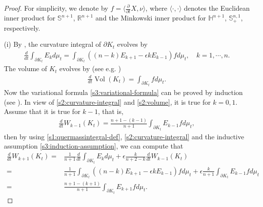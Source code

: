 \documentclass[11pt,reqno]{amsart}
\theoremstyle{definition}
\theoremstyle{remark}
\numberwithin{equation}{section}
\renewcommand{\(}{\left(}
\renewcommand{\)}{\right)}
\renewcommand{\~}{\tilde}
\renewcommand{\-}{\overline}
\newcommand{\e}{\epsilon}
\begin{document}
\begin{proof}
	For simplicity, we denote by $f=\langle\frac{\partial}{\partial t}X,\nu \rangle$, where $\langle \cdot,\cdot \rangle$ denotes the Euclidean inner product for $\mathbb S^{n+1}$, $\mathbb R^{n+1}$ and the Minkowski inner product for $\mathbb H^{n+1}$,  $\mathbb S^{n,1}_{+}$, respectively.
	
	(i) By \cite[Theorem A]{Reilly73}, the curvature integral of $\partial K_t$ evolves by
	\begin{align}\label{s2:curvature-integral}
	\frac{d}{dt}\int_{\partial K_t} E_k d\mu_t = \int_{\partial K_t} \( (n-k)E_{k+1}-\e kE_{k-1}   \)f d\mu_t, \quad k=1,\cdots,n.
	\end{align} 
	The volume of $K_t$ evolves by (see e.g. \cite{Barbosa-doCarmo-Eschenburg88})
	\begin{align}\label{s2:volume}
	\frac{d}{dt}\operatorname{Vol}(K_t)=\int_{\partial K_t} f d\mu_t.
	\end{align}
	Now the variational formula \eqref{s3:variational-formula} can be proved by induction (see \cite[Proposition 3.1]{Wang-Xia14}). In view of \eqref{s2:curvature-integral} and \eqref{s2:volume}, it is true for $k=0, 1$. Assume that it is true for $k-1$, that is,
	\begin{align}\label{s3:induction-assumption}
	\frac{d}{dt}W_{k-1}(K_t)=\frac{n+1-(k-1)}{n+1}\int_{\partial K_t} E_{k-1}f d\mu_t,
	\end{align}
	then by using \eqref{s1:quermassintegral-def}, \eqref{s2:curvature-integral} and the inductive assumption \eqref{s3:induction-assumption}, we can compute that
	\begin{align*}
	\frac{d}{dt}W_{k+1}(K_t)=&\frac{1}{n+1}\frac{d}{dt}\int_{\partial K_t}E_k d\mu_t+\e \frac{k}{n+2-k}\frac{d}{dt}W_{k-1}(K_t)\\
	=&\frac{1}{n+1}\int_{\partial K_t}\((n-k)E_{k+1}-\e kE_{k-1}\) f d\mu_t+\e \frac{k}{n+1}\int_{\partial K_t} E_{k-1}f d\mu_t \\
	=&\frac{n+1-(k+1)}{n+1}\int_{\partial K_t} E_{k+1}f d\mu_t.
	\end{align*}
		

\end{proof}
\end{document}
